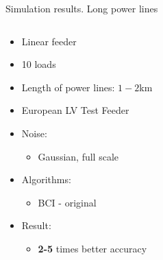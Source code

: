 \documentclass[../main.tex]{subfiles}
\begin{document}
\begin{frame}[t]{Simulation results. Long power lines}

\begin{columns}[t]
\begin{column}{0.4\textwidth}
\centering
\begin{itemize}
\item Linear feeder
\item 10 loads
\item Length of power lines: $1-2$km
\item European LV Test Feeder
\item Noise: 
	\begin{itemize}
		\item Gaussian, full scale
	\end{itemize}
\item Algorithms:
	\begin{itemize}
		\item BCI - original
	\end{itemize}
\item Result:
	\begin{itemize}
		\item \textbf{2-5} times better accuracy
	\end{itemize}
\end{itemize}
\end{column}
\begin{column}{0.7\textwidth}
	\centering
	\begin{figure}[H]
	\begin{adjustbox}{width=0.75\columnwidth}
	
	\end{adjustbox}
	\end{figure}
\end{column}
\end{columns}

\end{frame}
\end{document}
